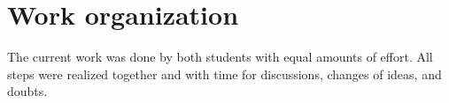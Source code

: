 \section{Work organization}
The current work was done by both students with equal amounts of effort. All steps were realized together and with time for discussions, changes of ideas, and doubts.


